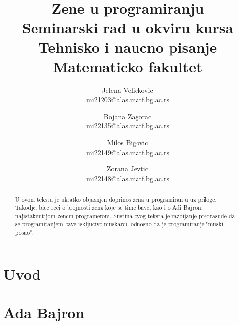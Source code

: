 \documentclass[a4paper,12pt]{article}
\begin{document}
\title{\textbf{Zene u programiranju\\} \small{Seminarski rad u okviru kursa\\Tehnisko i naucno pisanje\\ Matematicko fakultet}}

\author{Jelena Velickovic\\ mi21203@alas.matf.bg.ac.rs \and Bojana Zagorac\\ mi22135@alas.matf.bg.ac.rs \and Milos Bigovic\\ mi22149@alas.matf.bg.ac.rs \and Zorana Jevtic\\ mi22148@alas.matf.bg.ac.rs}

\date{\textit{}}

\maketitle

\begin{abstract}
    U ovom tekstu je ukratko objasnjen doprinos zena u programiranju uz priloge. Takodje, bice reci o
    brojnosti zena koje se time bave, kao i o Adi Bajron, najistaknutijom zenom programerom. Sustina 
    ovog teksta je razbijanje predrasude da se programiranjem bave iskljucivo muskarci, odnosno da je 
    programiranje "muski posao". 
\end{abstract}


\color{blue}\tableofcontents

\newpage
\color{black}\section{Uvod}

\newpage
\section{Ada Bajron}
\end{document}
